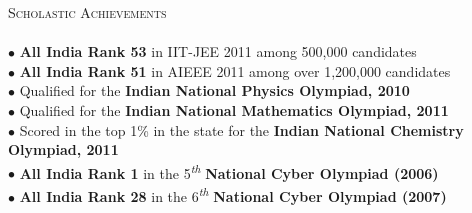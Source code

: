 \documentclass[a4paper,9pt]{article}
\begin{document}
\textcolor{myrust}{\large{\textsc{Scholastic Achievements}}}\textcolor{mygray}{\sout{\hfill}}\\\\
\normalsize
$\bullet$ \textbf{All India Rank 53} in IIT-JEE 2011 among 500,000 candidates\\
$\bullet$ \textbf{All India Rank 51} in AIEEE 2011 among over 1,200,000 candidates\\
$\bullet$ Qualified for the \textbf{Indian National Physics Olympiad, 2010}\\
$\bullet$ Qualified for the \textbf{Indian National Mathematics Olympiad, 2011}\\
$\bullet$ Scored in the top 1\% in the state for the \textbf{Indian National Chemistry Olympiad, 2011}\\
$\bullet$ \textbf{All India Rank 1} in the 5\textsuperscript{\emph{th}} \textbf{National Cyber Olympiad (2006)}\\
$\bullet$ \textbf{All India Rank 28} in the 6\textsuperscript{\emph{th}} \textbf{National Cyber Olympiad (2007)}\\
\end{document}
